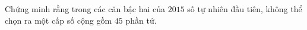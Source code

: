 \ifshowproblem
\begin{problem}\label{example:ROU-2015-MO-9-P1}
    Chứng minh rằng trong các căn bậc hai của \(2015\) số tự nhiên đầu tiên, không thể chọn ra một cấp số cộng gồm \(45\) phần tử.
\end{problem}
\fi

\footnotemark
{}
\fi